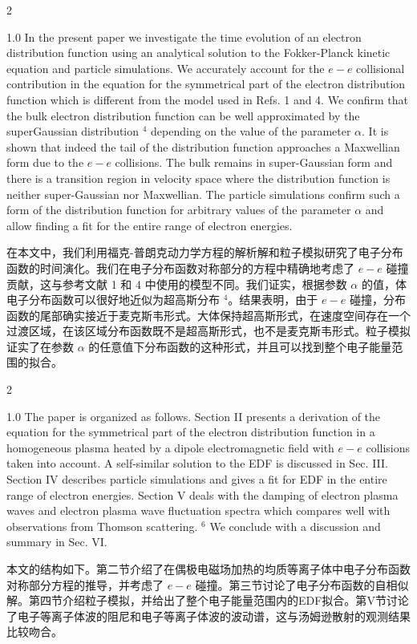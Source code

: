\documentclass[oneside,onecolumn]{article}
\newcommand\enzhbox[2]{
  	\quad\par \begin{paracol}{2} \colseprulecolor{black} 
  			\begin{spacing}{1.0}
  				\footnotesize  #1
  			\end{spacing}
  		\switchcolumn[1] 
  		#2
  	\end{paracol} 
  }
\begin{document}
\begin{sloppypar}
 
\enzhbox{   In the present paper we investigate the time evolution of an electron distribution function using an analytical solution to the Fokker-Planck kinetic equation and particle simulations. We accurately account for the $e-e$ collisional contribution in the equation for the symmetrical part of the electron distribution function which is different from the model used in Refs. 1 and 4. We confirm that the bulk electron distribution function can be well approximated by the superGaussian distribution ${ }^{4}$ depending on the value of the parameter $\alpha$. It is shown that indeed the tail of the distribution function approaches a Maxwellian form due to the $e-e$ collisions. The bulk remains in super-Gaussian form and there is a transition region in velocity space where the distribution function is neither super-Gaussian nor Maxwellian. The particle simulations confirm such a form of the distribution function for arbitrary values of the parameter $\alpha$ and allow finding a fit for the entire range of electron energies.
}{
在本文中，我们利用福克-普朗克动力学方程的解析解和粒子模拟研究了电子分布函数的时间演化。我们在电子分布函数对称部分的方程中精确地考虑了 $e-e$ 碰撞贡献，这与参考文献 1 和 4 中使用的模型不同。我们证实，根据参数 $\alpha$ 的值，体电子分布函数可以很好地近似为超高斯分布 ${ }^{4}$。结果表明，由于 $e-e$ 碰撞，分布函数的尾部确实接近于麦克斯韦形式。大体保持超高斯形式，在速度空间存在一个过渡区域，在该区域分布函数既不是超高斯形式，也不是麦克斯韦形式。粒子模拟证实了在参数 $\alpha$ 的任意值下分布函数的这种形式，并且可以找到整个电子能量范围的拟合。

}
  
 
\enzhbox{   The paper is organized as follows. Section II presents a derivation of the equation for the symmetrical part of the electron distribution function in a homogeneous plasma heated by a dipole electromagnetic field with $e-e$ collisions taken into account. A self-similar solution to the EDF is discussed in Sec. III. Section IV describes particle simulations and gives a fit for EDF in the entire range of electron energies. Section $\mathrm{V}$ deals with the damping of electron plasma waves and electron plasma wave fluctuation spectra which compares well with observations from Thomson scattering. ${ }^{6}$ We conclude with a discussion and summary in Sec. VI.
}{
本文的结构如下。第二节介绍了在偶极电磁场加热的均质等离子体中电子分布函数对称部分方程的推导，并考虑了 $e-e$ 碰撞。第三节讨论了电子分布函数的自相似解。第四节介绍粒子模拟，并给出了整个电子能量范围内的EDF拟合。第$\mathrm{V}$节讨论了电子等离子体波的阻尼和电子等离子体波的波动谱，这与汤姆逊散射的观测结果比较吻合。

}
\end{sloppypar}
\end{document}
